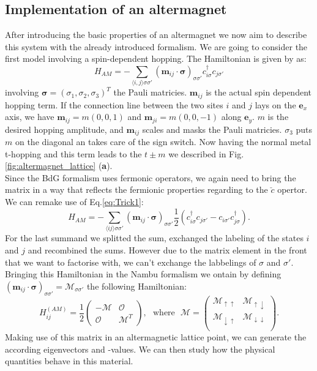 \documentclass[../main.tex]{main.tex}
\begin{document}
\subsection{Implementation of an altermagnet}
After introducing the basic properties of an altermagnet we now aim to describe this system with the already introduced formalism.
We are going to consider the first model involving a spin-dependent hopping. The Hamiltonian is given by \cite{Ouassou2023} as:
\begin{equation*}
    H_{AM} = -\sum_{\langle i, j\rangle\sigma\sigma'} \left(\bm{m}_{ij} \cdot \bm{\sigma}\right)_{\sigma\sigma'} c_{i\sigma}^{\dagger} c_{j\sigma'} 
\end{equation*}
involving $\bm{\sigma}=(\sigma_1, \sigma_2,\sigma_3)^T$ the Pauli matricies. $\bm{m}_{ij}$ is the actual spin dependent hopping term. If the connection line 
between the two sites $i$ and $j$ lays on the $\bm{e}_x$ axis, we have $\bm{m}_{ij} = m(0,0,1)$ and $\bm{m}_{ji} = m(0,0,-1)$ along $\bm{e}_y$. $m$ is 
the desired hopping amplitude, and $\bm{m}_{ij}$ scales and masks the Pauli matricies. $\sigma_3$ puts $m$ on the diagonal an takes care of the sign switch. Now having the normal metal t-hopping and this term leads to the $t\pm m$ we
described in Fig.\ref{fig:altermagnet_lattice} (\textbf{a}).\\

Since the BdG formalism uses fermonic operators, we again need to bring the matrix in a way that reflects the fermionic properties regarding to the $\check{c}$ opertor.
We can remake use of Eq.\ref{eq:Trick1}:
\begin{equation*}
    H_{AM} = -\sum_{\langle i j\rangle\sigma\sigma'} \left(\bm{m}_{ij} \cdot \bm{\sigma}\right)_{\sigma\sigma'} \frac{1}{2}\left(c_{i\sigma}^{\dagger} c_{j\sigma'} - c_{i\sigma'}c_{j\sigma}^{\dagger}\right).
\end{equation*}
For the last summand we splitted the sum, exchanged the labeling of the states $i$ and $j$ and recombined the sums. However due to the matrix element in the front
that we want to factorise with, we can't exchange the labbelings of $\sigma$ and $\sigma'$.
Bringing this Hamiltonian in the Nambu formalism we ontain by defining
$\left(\bm{m}_{ij} \cdot \bm{\sigma}\right)_{\sigma\sigma'} = \mathcal{M}_{\sigma\sigma'}$ 
the following Hamiltonian:
\begin{equation*}
    H^{(AM)}_{ij} = \frac{1}{2}\begin{pmatrix}
        -\mathcal{M} & \mathcal{O}\\
        \mathcal{O} & \mathcal{M}^T
    \end{pmatrix}
    ,~~~ \text{where} ~~~ \mathcal{M} = \begin{pmatrix}
        \mathcal{M}_{\uparrow\uparrow} & \mathcal{M}_{\uparrow\downarrow}\\
        \mathcal{M}_{\downarrow\uparrow} & \mathcal{M}_{\downarrow\downarrow}\\
    \end{pmatrix}.
\end{equation*}
Making use of this matrix in an altermagnetic lattice point, we can generate the according eigenvectors and -values. We can then study how the physical quantities 
behave in this material.\\
\end{document}

